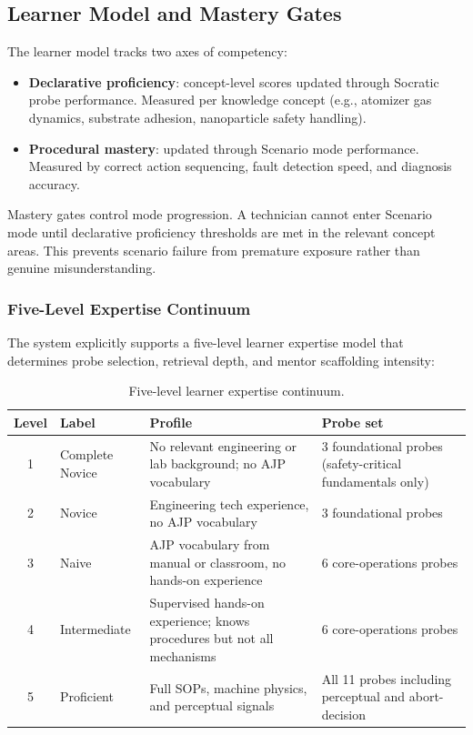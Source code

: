\documentclass[10pt,letterpaper,twocolumn]{article}
\begin{document}
\subsection{Learner Model and Mastery Gates}
\label{sec:learner-model}

The learner model tracks two axes of competency:

\begin{itemize}
  \item \textbf{Declarative proficiency}: concept-level scores updated through Socratic probe performance. Measured per knowledge concept (e.g., atomizer gas dynamics, substrate adhesion, nanoparticle safety handling).
  \item \textbf{Procedural mastery}: updated through Scenario mode performance. Measured by correct action sequencing, fault detection speed, and diagnosis accuracy.
\end{itemize}

Mastery gates control mode progression. A technician cannot enter Scenario mode until declarative proficiency thresholds are met in the relevant concept areas. This prevents scenario failure from premature exposure rather than genuine misunderstanding.

\subsubsection{Five-Level Expertise Continuum}
\label{sec:five-level}

The system explicitly supports a five-level learner expertise model that determines probe selection, retrieval depth, and mentor scaffolding intensity:

\begin{table}[t]
\centering
\begin{tabularx}{\textwidth}{@{}c l X X@{}}
\toprule
\textbf{Level} & \textbf{Label} & \textbf{Profile} & \textbf{Probe set} \\
\midrule
1 & Complete Novice & No relevant engineering or lab background; no AJP vocabulary & 3 foundational probes (safety-critical fundamentals only) \\
2 & Novice & Engineering tech experience, no AJP vocabulary & 3 foundational probes \\
3 & Naive & AJP vocabulary from manual or classroom, no hands-on experience & 6 core-operations probes \\
4 & Intermediate & Supervised hands-on experience; knows procedures but not all mechanisms & 6 core-operations probes \\
5 & Proficient & Full SOPs, machine physics, and perceptual signals & All 11 probes including perceptual and abort-decision \\
\bottomrule
\end{tabularx}
\caption{Five-level learner expertise continuum.}
\label{tab:five-level}
\end{table}
\end{document}
